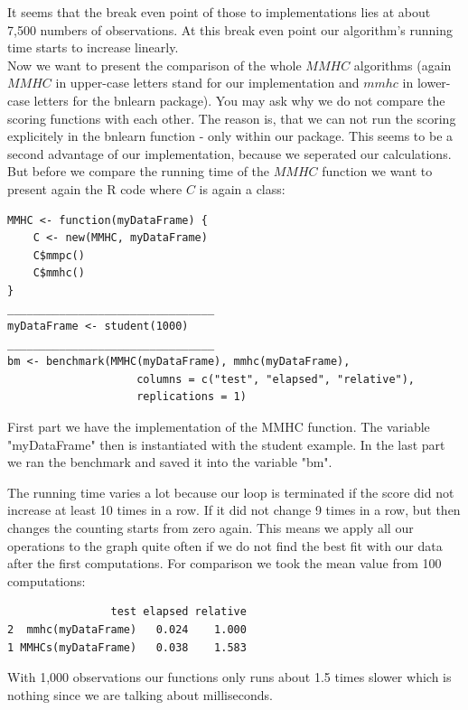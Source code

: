 
	It seems that the break even point of those to implementations lies at about 7,500 numbers of observations. At this break even point our algorithm's running time starts to increase linearly. \\

	Now we want to present the comparison of the whole $MMHC$ algorithms (again $MMHC$ in upper-case letters stand for our implementation and $mmhc$ in lower-case letters for the bnlearn package). You may ask why we do not compare the scoring functions with each other. The reason is, that we can not run the scoring explicitely in the bnlearn function - only within our package. This seems to be a second advantage of our implementation, because we seperated our calculations. But before we compare the running time of the $MMHC$ function we want to present again the R code where $C$ is again a class:

	\begin{program}[H]
		\begin{snugshade}
  			\begin{verbatim}
MMHC <- function(myDataFrame) {
    C <- new(MMHC, myDataFrame)
    C$mmpc()
    C$mmhc()
}
________________________________
myDataFrame <- student(1000)
________________________________
bm <- benchmark(MMHC(myDataFrame), mmhc(myDataFrame),
                    columns = c("test", "elapsed", "relative"),
                    replications = 1)
			\end{verbatim}
 		\end{snugshade}
		\caption{First part we have the implementation of the MMHC function. The variable "myDataFrame" then is instantiated with the student example. In the last part we ran the benchmark and saved it into the variable "bm".}
 	\end{program}

 	The running time varies a lot because our loop is terminated if the score did not increase at least 10 times in a row. If it did not change 9 times in a row, but then changes the counting starts from zero again. This means we apply all our operations to the graph quite often if we do not find the best fit with our data after the first computations. For comparison we took the mean value from 100 computations:

	\begin{program}
		\begin{snugshade}
  			\begin{verbatim}
                test elapsed relative
2  mmhc(myDataFrame)   0.024    1.000
1 MMHCs(myDataFrame)   0.038    1.583
			\end{verbatim}
 		\end{snugshade}
		\caption{With 1,000 observations our functions only runs about 1.5 times slower which is nothing since we are talking about milliseconds.}
 	\end{program}

